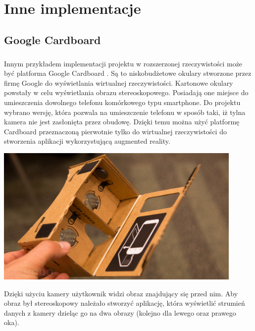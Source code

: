 \chapter{Inne implementacje}
\section{Google Cardboard}
\paragraph{}
Innym przykładem implementacji projektu w rozszerzonej rzeczywistości może być platforma Google Cardboard \cite{cardboard}. Są to niskobudżetowe okulary stworzone przez firmę Google do wyświetlania wirtualnej rzeczywistości. Kartonowe okulary powstały w celu wyświetlania obrazu stereoskopowego. Posiadają one miejsce do umieszczenia dowolnego telefonu komórkowego typu smartphone. Do projektu wybrano wersję, która pozwala na umieszczenie telefonu w sposób taki, iż tylna kamera nie jest zasłonięta przez obudowę. Dzięki temu można użyć platformę Cardboard przeznaczoną pierwotnie tylko do wirtualnej rzeczywistości do stworzenia aplikacji wykorzystującą augmented reality.
\begin{center}
\includegraphics[width=0.9\textwidth]{images/cardboard.jpg}
\end{center}
Dzięki użyciu kamery użytkownik widzi obraz znajdujący się przed nim. Aby obraz był stereoskopowy należało stworzyć aplikację, która wyświetlić strumień danych z kamery dzieląc go na dwa obrazy (kolejno dla lewego oraz prawego oka).

